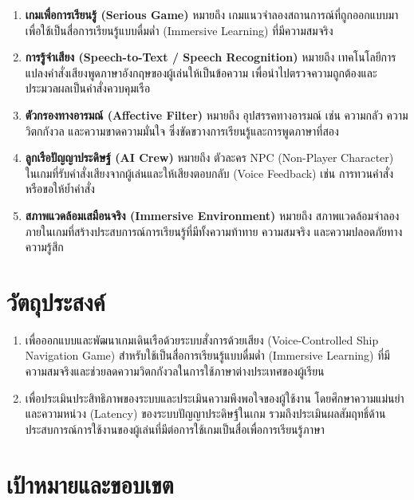\begin{enumerate}[label=\arabic*)]
    \item \textbf{เกมเพื่อการเรียนรู้ (Serious Game)} หมายถึง เกมแนวจำลองสถานการณ์ที่ถูกออกแบบมาเพื่อใช้เป็นสื่อการเรียนรู้แบบดื่มด่ำ (Immersive Learning) ที่มีความสมจริง
    \item \textbf{การรู้จำเสียง (Speech-to-Text / Speech Recognition)} หมายถึง เทคโนโลยีการแปลงคำสั่งเสียงพูดภาษาอังกฤษของผู้เล่นให้เป็นข้อความ เพื่อนำไปตรวจความถูกต้องและประมวลผลเป็นคำสั่งควบคุมเรือ
    \item \textbf{ตัวกรองทางอารมณ์ (Affective Filter)} หมายถึง อุปสรรคทางอารมณ์ เช่น ความกลัว ความวิตกกังวล และความขาดความมั่นใจ ซึ่งขัดขวางการเรียนรู้และการพูดภาษาที่สอง
    \item \textbf{ลูกเรือปัญญาประดิษฐ์ (AI Crew)} หมายถึง ตัวละคร NPC (Non-Player Character) ในเกมที่รับคำสั่งเสียงจากผู้เล่นและให้เสียงตอบกลับ (Voice Feedback) เช่น การทวนคำสั่งหรือขอให้ย้ำคำสั่ง
    \item \textbf{สภาพแวดล้อมเสมือนจริง (Immersive Environment)} หมายถึง สภาพแวดล้อมจำลองภายในเกมที่สร้างประสบการณ์การเรียนรู้ที่มีทั้งความท้าทาย ความสมจริง และความปลอดภัยทางความรู้สึก
\end{enumerate}

\section{วัตถุประสงค์}

\begin{enumerate}[label=\arabic*)]
    \item เพื่อออกแบบและพัฒนาเกมเดินเรือด้วยระบบสั่งการด้วยเสียง (Voice-Controlled Ship Navigation Game) สำหรับใช้เป็นสื่อการเรียนรู้แบบดื่มด่ำ (Immersive Learning) ที่มีความสมจริงและช่วยลดความวิตกกังวลในการใช้ภาษาต่างประเทศของผู้เรียน
    \item เพื่อประเมินประสิทธิภาพของระบบและประเมินความพึงพอใจของผู้ใช้งาน โดยศึกษาความแม่นยำและความหน่วง (Latency) ของระบบปัญญาประดิษฐ์ในเกม รวมถึงประเมินผลสัมฤทธิ์ด้านประสบการณ์การใช้งานของผู้เล่นที่มีต่อการใช้เกมเป็นสื่อเพื่อการเรียนรู้ภาษา
\end{enumerate}

\section{เป้าหมายและขอบเขต}

